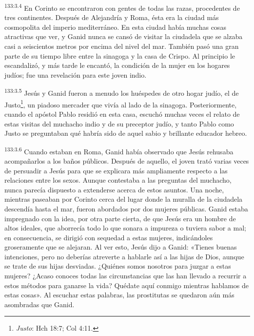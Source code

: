 \par
\textsuperscript{133:3.4} En Corinto se encontraron con gentes de todas las razas, procedentes de tres continentes. Después de Alejandría y Roma, ésta era la ciudad más cosmopolita del imperio mediterráneo. En esta ciudad había muchas cosas atractivas que ver, y Ganid nunca se cansó de visitar la ciudadela que se alzaba casi a seiscientos metros por encima del nivel del mar. También pasó una gran parte de su tiempo libre entre la sinagoga y la casa de Crispo. Al principio le escandalizó, y más tarde le encantó, la condición de la mujer en los hogares judíos; fue una revelación para este joven indio.

\par
\textsuperscript{133:3.5} Jesús y Ganid fueron a menudo los huéspedes de otro hogar judío, el de Justo\footnote{\textit{Justo}: Hch 18:7; Col 4:11.}, un piadoso mercader que vivía al lado de la sinagoga. Posteriormente, cuando el apóstol Pablo residió en esta casa, escuchó muchas veces el relato de estas visitas del muchacho indio y de su preceptor judío, y tanto Pablo como Justo se preguntaban qué habría sido de aquel sabio y brillante educador hebreo.

\par
\textsuperscript{133:3.6} Cuando estaban en Roma, Ganid había observado que Jesús rehusaba acompañarlos a los baños públicos. Después de aquello, el joven trató varias veces de persuadir a Jesús para que se explicara más ampliamente respecto a las relaciones entre los sexos. Aunque contestaba a las preguntas del muchacho, nunca parecía dispuesto a extenderse acerca de estos asuntos. Una noche, mientras paseaban por Corinto cerca del lugar donde la muralla de la ciudadela descendía hasta el mar, fueron abordados por dos mujeres públicas. Ganid estaba impregnado con la idea, por otra parte cierta, de que Jesús era un hombre de altos ideales, que aborrecía todo lo que sonara a impureza o tuviera sabor a mal; en consecuencia, se dirigió con sequedad a estas mujeres, indicándoles groseramente que se alejaran. Al ver esto, Jesús dijo a Ganid: «Tienes buenas intenciones, pero no deberías atreverte a hablarle así a las hijas de Dios, aunque se trate de sus hijas desviadas. ¿Quiénes somos nosotros para juzgar a estas mujeres? ¿Acaso conoces todas las circunstancias que las han llevado a recurrir a estos métodos para ganarse la vida? Quédate aquí conmigo mientras hablamos de estas cosas». Al escuchar estas palabras, las prostitutas se quedaron aún más asombradas que Ganid.

